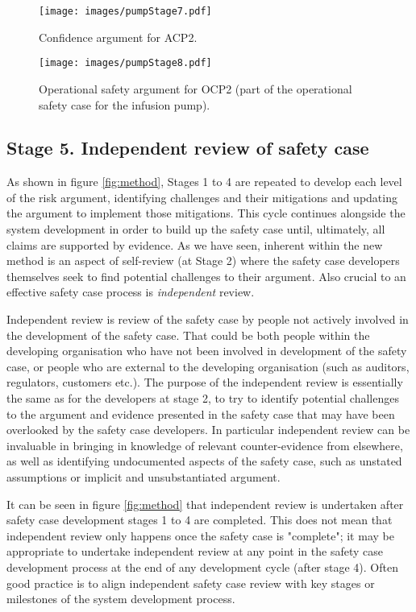 \begin{figure*}
\centering
\texttt{[image: images/pumpStage7.pdf]}
\caption{Confidence argument for ACP2.}
\label{fig:pump7}
\end{figure*}

\begin{figure*}
\centering
\texttt{[image: images/pumpStage8.pdf]}
\caption{Operational safety argument for OCP2 (part of the operational safety case for the infusion pump).}
\label{fig:pump8}
\end{figure*}

\subsection{Stage 5. Independent review of safety case}

As shown in figure \ref{fig:method}, Stages 1 to 4 are repeated to develop each level of the risk argument, identifying challenges and their mitigations and updating the argument to implement those mitigations. This cycle continues alongside the system development in order to build up the safety case until, ultimately, all claims are supported by evidence. As we have seen, inherent within the new method is an aspect of self-review (at Stage 2) where the safety case developers themselves seek to find potential challenges to their argument. Also crucial to an effective safety case process is \textit{independent} review.

Independent review is review of the safety case by people not actively involved in the development of the safety case. That could be both people within the developing organisation who have not been involved in development of the safety case, or people who are external to the developing organisation (such as auditors, regulators, customers etc.). The purpose of the independent review is essentially the same as for the developers at stage 2, to try to identify potential challenges to the argument and evidence presented in the safety case that may have been overlooked by the safety case developers. In particular independent review can be invaluable in bringing in knowledge of relevant counter-evidence from elsewhere, as well as identifying undocumented aspects of the safety case, such as unstated assumptions or implicit and unsubstantiated argument.

It can be seen in figure \ref{fig:method} that independent review is undertaken after safety case development stages 1 to 4 are completed. This does not mean that independent review only happens once the safety case is "complete"; it may be appropriate to undertake independent review at any point in the safety case development process at the end of any development cycle (after stage 4). Often good practice is to align independent safety case review with key stages or milestones of the system development process.

